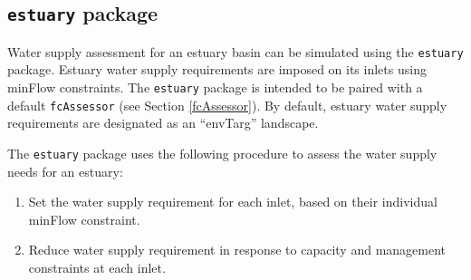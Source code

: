 \subsection{{\tt estuary} package }

Water supply assessment for an estuary basin can be simulated using
the {\tt estuary} package.  Estuary water supply requirements are
imposed on its inlets using minFlow constraints.  The {\tt estuary}
package is intended to be paired with a default {\tt fcAssessor} (see
Section \ref{fcAssessor}).  By default, estuary water supply
requirements are designated as an ``envTarg'' landscape.

The {\tt estuary} package uses the following procedure to assess the
water supply needs for an estuary:

\begin{enumerate}

 \item Set the water supply requirement for each inlet,
   based on their individual minFlow constraint.

 \item Reduce water supply requirement in response to capacity and
 management constraints at each inlet.

\end{enumerate}

